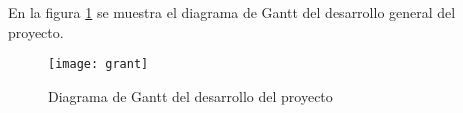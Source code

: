 En la figura \ref{fig:grant} se muestra el diagrama de Gantt del desarrollo general del proyecto.
\begin{figure}[h!]
    \centering
    \texttt{[image: grant]}
    \caption{Diagrama de Gantt del desarrollo del proyecto}
    \label{fig:grant}
\end{figure}
